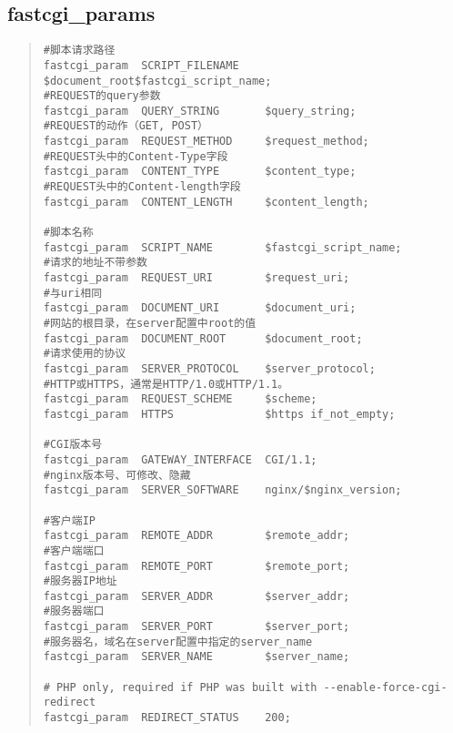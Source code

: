 \documentclass[UTF8]{ctexart}
\newenvironment{myquote}
  {\begin{quote} \kaishu \zihao{-5}}
  {\end{quote}}
\begin{document}
\subsection{fastcgi\_params}
\begin{myquote}
  \begin{verbatim}
#脚本请求路径
fastcgi_param  SCRIPT_FILENAME    $document_root$fastcgi_script_name;
#REQUEST的query参数
fastcgi_param  QUERY_STRING       $query_string;
#REQUEST的动作（GET, POST）
fastcgi_param  REQUEST_METHOD     $request_method;
#REQUEST头中的Content-Type字段
fastcgi_param  CONTENT_TYPE       $content_type;
#REQUEST头中的Content-length字段
fastcgi_param  CONTENT_LENGTH     $content_length;

#脚本名称
fastcgi_param  SCRIPT_NAME        $fastcgi_script_name;
#请求的地址不带参数
fastcgi_param  REQUEST_URI        $request_uri;
#与uri相同
fastcgi_param  DOCUMENT_URI       $document_uri;
#网站的根目录，在server配置中root的值
fastcgi_param  DOCUMENT_ROOT      $document_root;
#请求使用的协议
fastcgi_param  SERVER_PROTOCOL    $server_protocol;
#HTTP或HTTPS，通常是HTTP/1.0或HTTP/1.1。
fastcgi_param  REQUEST_SCHEME     $scheme;
fastcgi_param  HTTPS              $https if_not_empty;

#CGI版本号
fastcgi_param  GATEWAY_INTERFACE  CGI/1.1;
#nginx版本号、可修改、隐藏
fastcgi_param  SERVER_SOFTWARE    nginx/$nginx_version;

#客户端IP
fastcgi_param  REMOTE_ADDR        $remote_addr;
#客户端端口
fastcgi_param  REMOTE_PORT        $remote_port;
#服务器IP地址
fastcgi_param  SERVER_ADDR        $server_addr;
#服务器端口
fastcgi_param  SERVER_PORT        $server_port;
#服务器名，域名在server配置中指定的server_name
fastcgi_param  SERVER_NAME        $server_name;

# PHP only, required if PHP was built with --enable-force-cgi-redirect
fastcgi_param  REDIRECT_STATUS    200;
  \end{verbatim}
\end{myquote}
\end{document}
